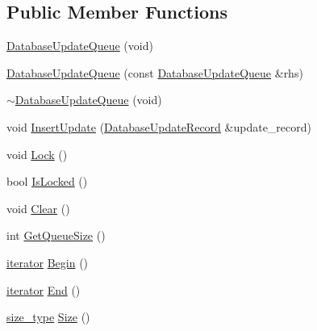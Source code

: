 \subsection*{Public Member Functions}
\begin{DoxyCompactItemize}
\item 
\hyperlink{class_database_update_1_1_database_update_queue_a1d13022c67435c5ebd3e5456b155f047}{Database\+Update\+Queue} (void)
\item 
\hyperlink{class_database_update_1_1_database_update_queue_a910525adae9f0f72934df911083cb4ae}{Database\+Update\+Queue} (const \hyperlink{class_database_update_1_1_database_update_queue}{Database\+Update\+Queue} \&rhs)
\item 
\hyperlink{class_database_update_1_1_database_update_queue_a1a843be8db76fe69e7d1f4643c52165d}{$\sim$\+Database\+Update\+Queue} (void)
\item 
void \hyperlink{class_database_update_1_1_database_update_queue_a3a0c1d7cf8b899d793e06fc7d35a3aa1}{Insert\+Update} (\hyperlink{class_database_update_1_1_database_update_record}{Database\+Update\+Record} \&update\+\_\+record)
\item 
void \hyperlink{class_database_update_1_1_database_update_queue_a3596a3a04dfc7f092f9dc020324ee266}{Lock} ()
\item 
bool \hyperlink{class_database_update_1_1_database_update_queue_a4b9bd59d11981ec43cac8e2120a88035}{Is\+Locked} ()
\item 
void \hyperlink{class_database_update_1_1_database_update_queue_a496063d1d30b62db777a6930557fbd87}{Clear} ()
\item 
int \hyperlink{class_database_update_1_1_database_update_queue_a5b3040fbd984d246624cc9947255dc2e}{Get\+Queue\+Size} ()
\item 
\hyperlink{class_database_update_1_1_database_update_queue_1_1iterator}{iterator} \hyperlink{class_database_update_1_1_database_update_queue_ac23fef473b3ae348c8679435e4bb8f18}{Begin} ()
\item 
\hyperlink{class_database_update_1_1_database_update_queue_1_1iterator}{iterator} \hyperlink{class_database_update_1_1_database_update_queue_ae2eadb9750449bc9fcbba2231093eccd}{End} ()
\item 
\hyperlink{class_database_update_1_1_database_update_queue_a76ce338ce8121f40a293ed5b7024240b}{size\+\_\+type} \hyperlink{class_database_update_1_1_database_update_queue_a0d86a544e1fb6d527bf0f4d31ccf22b4}{Size} ()
\end{DoxyCompactItemize}


